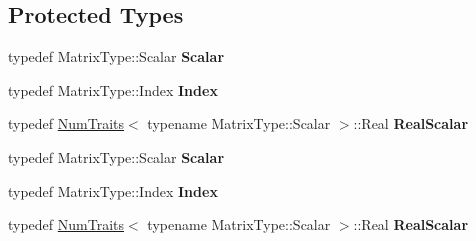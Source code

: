 \subsection*{Protected Types}
\begin{DoxyCompactItemize}
\item 
\mbox{\label{class_eigen_1_1_skyline_inplace_l_u_a45f73a46e9c9e8d151eead7eaa86d9f3}} 
typedef Matrix\+Type\+::\+Scalar {\bfseries Scalar}
\item 
\mbox{\label{class_eigen_1_1_skyline_inplace_l_u_a769c9223e1c10c32665757f9992cd7bf}} 
typedef Matrix\+Type\+::\+Index {\bfseries Index}
\item 
\mbox{\label{class_eigen_1_1_skyline_inplace_l_u_ae2ff35223fce0bccdce7224343e5d61f}} 
typedef \hyperlink{group___core___module_struct_eigen_1_1_num_traits}{Num\+Traits}$<$ typename Matrix\+Type\+::\+Scalar $>$\+::Real {\bfseries Real\+Scalar}
\item 
\mbox{\label{class_eigen_1_1_skyline_inplace_l_u_a45f73a46e9c9e8d151eead7eaa86d9f3}} 
typedef Matrix\+Type\+::\+Scalar {\bfseries Scalar}
\item 
\mbox{\label{class_eigen_1_1_skyline_inplace_l_u_a769c9223e1c10c32665757f9992cd7bf}} 
typedef Matrix\+Type\+::\+Index {\bfseries Index}
\item 
\mbox{\label{class_eigen_1_1_skyline_inplace_l_u_ae2ff35223fce0bccdce7224343e5d61f}} 
typedef \hyperlink{group___core___module_struct_eigen_1_1_num_traits}{Num\+Traits}$<$ typename Matrix\+Type\+::\+Scalar $>$\+::Real {\bfseries Real\+Scalar}
\end{DoxyCompactItemize}
